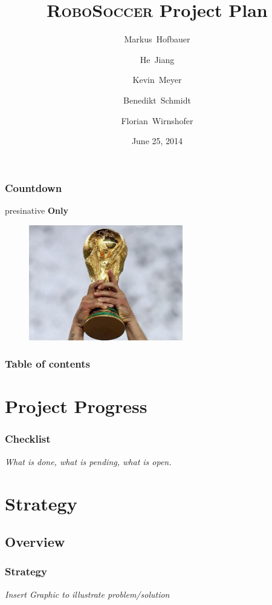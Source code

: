 \documentclass[hyperref={pdfpagelabels=false}]{beamer}
\title{\textsc{RoboSoccer} Project Plan}
\author[Hofbauer, Jiang, Meyer, Schmidt, Wirnshofer]{
  Markus~Hofbauer \and
  He~Jiang \and
  Kevin~Meyer \and
  Benedikt~Schmidt \and
  Florian~Wirnshofer
}
\institute
{
	Technische Universität München, Germany
}
\date{June 25, 2014}
\begin{document}
\begin{frame}
	\titlepage
\end{frame}

\begin{frame}
\frametitle{Countdown}
	\hfill
		\begin{beamercolorbox}[shadow=true, rounded=true, wd=10cm]{presinative}
			\centering
			\Large{\textbf{Only }}
			\Huge {}
			\Large{}
		\end{beamercolorbox}
	\hfill
	\begin{figure}
		\centering
		\includegraphics[width=0.6\textwidth]{Pictures/wm}
	\end{figure}
\end{frame}

\begin{frame}
	\frametitle{Table of contents}
	\tableofcontents
\end{frame}

\section{Project Progress}
\begin{frame}
    \frametitle{Checklist}
    \textit{What is done, what is pending, what is open.}
\end{frame}

\section{Strategy}
\subsection{Overview}
\begin{frame}
    \frametitle{Strategy}
    \textit{Insert Graphic to illustrate problem/solution}
\end{frame}
\end{document}
